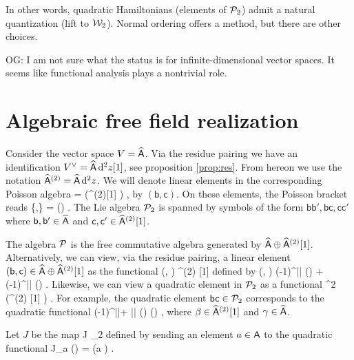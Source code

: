 \documentclass[11pt]{amsart}
\def\C{{\mathbb{C}}}
\newcommand{\laurent}{\Hat \sfA}
\newcommand{\sfb}{\mathsf{b}}
\newcommand{\sfc}{\mathsf{c}}
\def\owen#1{{\textcolor{violet!65!black}{OG: {#1}}}}
\begin{document}
In other words, quadratic Hamiltonians (elements of $\mathcal P_2$) admit a natural quantization (lift to $\mathcal W_2$).
Normal ordering offers a method, but there are other choices.

\owen{I am not sure what the status is for infinite-dimensional vector spaces. It seems like functional analysis plays a nontrivial role.}

\section{Algebraic free field realization}

Consider the vector space $V = \laurent$.
Via the residue pairing we have an identification $V^\vee = \laurent \, \d^2 z [1]$, see proposition \ref{prop:res}.
From hereon we use the notation $\laurent^{(2)} = \laurent \, \d^2 z$.
We will denote linear elements in the corresponding Poisson algebra
\beqn
\cP = \Sym \left(\laurent  \oplus \laurent^{(2)}[1] \right) ,
\eeqn
by $(\sfb , \sfc)$.
On these elements, the Poisson bracket reads
\beqn
\{\sfb ,\sfc\} = \Res(\sfb \sfc) .
\eeqn
The Lie algebra $\mathcal P_2$ is spanned by symbols of the form $\sfb \sfb',\sfb \sfc, \sfc \sfc'$ where $\sfb,\sfb'\in \laurent$ and $\sfc,\sfc' \in \laurent^{(2)}[1]$.

The algebra $\mathcal P$ is the free commutative algebra generated by $\laurent \oplus \laurent^{(2)}[1]$.
Alternatively, we can view, via the residue pairing, a linear element $(\sfb, \sfc) \in \laurent \oplus \laurent^{(2)}[1]$ as the functional
\beqn
(\sfb, \sfc) \colon \laurent^{(2)} [1] \oplus \laurent \to \C
\eeqn
defined by
\beqn
(\beta, \gamma) \mapsto (-1)^{|\sfb|} \Res(\sfb \beta) + (-1)^{|\sfc|} \Res(\sfc \gamma) .
\eeqn
Likewise, we can view a quadratic element in $\mathcal P_2$ as a functional
\beqn
\Sym^2 \left(\laurent^{(2)} [1] \oplus \laurent \right) \to \C .
\eeqn
For example, the quadratic element $\sfb \sfc \in \cP_2$ corresponds to the quadratic functional
\beqn
\beta \gamma \mapsto (-1)^{|\sfb|+ |\sfc|} \Res (\sfb \beta) \Res(\sfc \gamma) ,
\eeqn
where $\beta \in \laurent^{(2)} [1]$ and $\gamma \in \laurent$.

Let $J$ be the map
\beqn
J \colon \laurent \to \cP_2
\eeqn
defined by sending an element $a \in \mathsf A$ to the quadratic functional
\beqn
J_a (\beta \gamma) = \Res(\beta a \gamma) .
\eeqn
\end{document}
